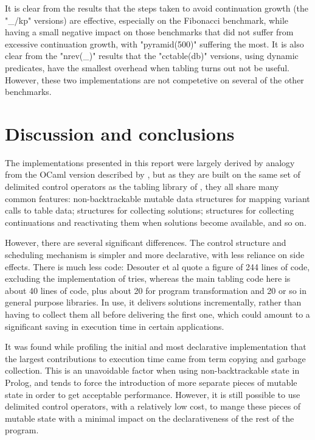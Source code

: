 It is clear from the results that the steps taken to avoid continuation
growth (the "_/kp" versions) are effective, especially on the Fibonacci benchmark, while having
a small negative impact on those benchmarks that did not suffer from excessive continuation
growth, with "pyramid(500)" suffering the most. It is also clear from the "nrev(_)" results
that the "cctable(db)" versions, using dynamic predicates, have the smallest overhead when
tabling turns out not be useful. However, these two implementations are not
competetive on several of the other benchmarks.

\section{Discussion and conclusions}

The implementations presented in this report were largely derived by analogy from the OCaml
version described by \cite{Abdallah2017a}, but as they are built on the same set of delimited
control operators as the tabling library of \cite{DesouterVan-DoorenSchrijvers2015}, they all
share many common features: non-backtrackable mutable data structures for mapping variant calls
to table data; structures for collecting solutions; structures for collecting continuations and
reactivating them when solutions become available, and so on.

However, there are several significant differences.
The control structure and scheduling mechanism is simpler and more declarative, with less
reliance on side effects. There is much less code: Desouter
et al quote a figure of 244 lines of code, excluding the implementation of tries,
whereas the main tabling code here is about 40 lines of code, plus about 20 for program transformation
and 20 or so in general purpose libraries.
In use, it delivers solutions incrementally, rather than having to collect them all before 
delivering the first one, which could amount to a significant saving in execution time
in certain applications.

It was found while profiling the initial and most declarative implementation that the
largest contributions to execution time came from term copying and garbage collection.
This is an unavoidable factor when using non-backtrackable state in Prolog, and tends to force
the introduction of more separate pieces of mutable state in order to get acceptable
performance. However, it is still possible to use delimited control operators, with a relatively
low cost, to mange these pieces of mutable state with a minimal impact on the declarativeness
of the rest of the program.


